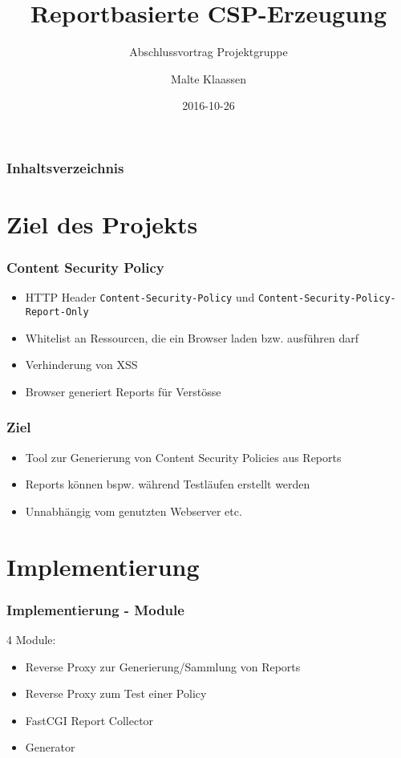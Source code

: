 \documentclass[handout]{beamer}
\title[Reportbasierte CSP Erzeugung]{Reportbasierte CSP-Erzeugung}
\subtitle{Abschlussvortrag Projektgruppe}
\author[Klaassen]{Malte Klaassen}
\date{2016-10-26}
\begin{document}
\begin{frame}%
\titlepage
\end{frame}

\begin{frame}%
	\frametitle{Inhaltsverzeichnis}
	\tableofcontents%
\end{frame}

\section{Ziel des Projekts}

\begin{frame}
\frametitle{Content Security Policy}
\begin{itemize}
\item HTTP Header \colorbox{verylightgray}{\lstinline[basicstyle=\ttfamily\color{black}]|Content-Security-Policy|} und \colorbox{verylightgray}{\lstinline[basicstyle=\ttfamily\color{black}]|Content-Security-Policy-Report-Only|}
\item Whitelist an Ressourcen, die ein Browser laden bzw. ausf\"uhren darf
\item Verhinderung von XSS
\item Browser generiert Reports f\"ur Verst\"osse
\
\end{itemize}
\end{frame}

\begin{frame}
\frametitle{Ziel}
\begin{itemize}
\item Tool zur Generierung von Content Security Policies aus Reports
\item Reports k\"onnen bspw. w\"ahrend Testl\"aufen erstellt werden
\item Unnabh\"angig vom genutzten Webserver etc.
\end{itemize}
\end{frame}

\section{Implementierung}

\begin{frame}
\frametitle{Implementierung - Module}
4 Module:
\begin{itemize}
\item Reverse Proxy zur Generierung/Sammlung von Reports
\item Reverse Proxy zum Test einer Policy
\item FastCGI Report Collector 
\item Generator
\end{itemize}
\end{frame}
\end{document}
